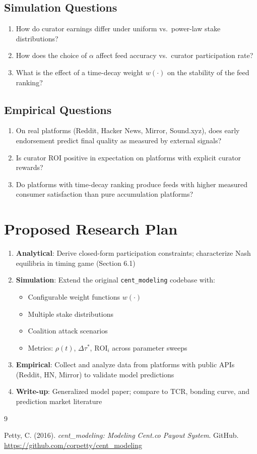 \documentclass[12pt]{article}
\begin{document}
\subsection{Simulation Questions}

\begin{enumerate}
  \item How do curator earnings differ under uniform vs.\ power-law stake distributions?
  \item How does the choice of $\alpha$ affect feed accuracy vs.\ curator participation rate?
  \item What is the effect of a time-decay weight $w(\cdot)$ on the stability of the feed ranking?
\end{enumerate}

\subsection{Empirical Questions}

\begin{enumerate}
  \item On real platforms (Reddit, Hacker News, Mirror, Sound.xyz), does early endorsement predict final quality as measured by external signals?
  \item Is curator ROI positive in expectation on platforms with explicit curator rewards?
  \item Do platforms with time-decay ranking produce feeds with higher measured consumer satisfaction than pure accumulation platforms?
\end{enumerate}

\section{Proposed Research Plan}

\begin{enumerate}
  \item \textbf{Analytical}: Derive closed-form participation constraints; characterize Nash equilibria in timing game (Section 6.1)
  \item \textbf{Simulation}: Extend the original \texttt{cent\_modeling} codebase with:
    \begin{itemize}
      \item Configurable weight functions $w(\cdot)$
      \item Multiple stake distributions
      \item Coalition attack scenarios
      \item Metrics: $\rho(t)$, $\Delta\tau^*$, $\mathrm{ROI}_i$ across parameter sweeps
    \end{itemize}
  \item \textbf{Empirical}: Collect and analyze data from platforms with public APIs (Reddit, HN, Mirror) to validate model predictions
  \item \textbf{Write-up}: Generalized model paper; compare to TCR, bonding curve, and prediction market literature
\end{enumerate}

\begin{thebibliography}{9}

Petty, C. (2016). \textit{cent\_modeling: Modeling Cent.co Payout System}. GitHub.
\url{https://github.com/corpetty/cent_modeling}

\end{thebibliography}
\end{document}
